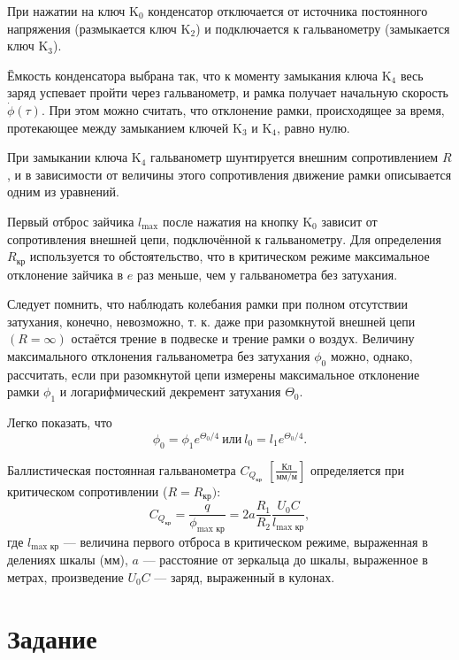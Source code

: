 При нажатии на ключ $\text{K}_0$ конденсатор отключается от источника постоянного напряжения (размыкается ключ $\text{K}_2$) и подключается к гальванометру (замыкается ключ $\text{K}_3$).

Ёмкость конденсатора выбрана так, что к моменту замыкания ключа $\text{K}_4$ весь заряд успевает пройти через гальванометр, и рамка получает начальную скорость $\dot{\phi}(\tau)$. При этом можно считать, что отклонение рамки, происходящее за время, протекающее между замыканием ключей $\text{K}_3$ и $\text{K}_4$, равно нулю.

При замыкании ключа $\text{K}_4$ гальванометр шунтируется внешним сопротивлением $R$, и в зависимости от величины этого сопротивления движение рамки описывается одним из уравнений.

Первый отброс зайчика $l_{\text{max}}$ после нажатия на кнопку $\text{K}_0$ зависит от сопротивления внешней цепи, подключённой к гальванометру. Для определения $R_{\text{кр}}$ используется то обстоятельство, что в критическом режиме максимальное отклонение зайчика в $e$ раз меньше, чем у гальванометра без затухания.

Следует помнить, что наблюдать колебания рамки при полном отсутствии затухания, конечно, невозможно, т. к. даже при разомкнутой внешней цепи $(R = \infty)$ остаётся трение в подвеске и трение рамки о воздух. Величину максимального отклонения гальванометра без затухания $\phi_0$ можно, однако, рассчитать, если при разомкнутой цепи измерены максимальное отклонение рамки $\phi_1$ и логарифмический декремент затухания $\Theta_0$.

Легко показать, что
\begin{equation}
    \phi_0 = \phi_1 e^{{\Theta_0}/4}~\text{или}~l_0 = l_1 e^{{\Theta_0}/4}.
\end{equation}

Баллистическая постоянная гальванометра $C_{Q_{\text{кр}}}$ $\left[\frac{\text{Кл}}{\text{мм/м}}\right]$ определяется при критическом сопротивлении ($R = R_{\text{кр}})$:
\begin{equation}
    C_{Q_{\text{кр}}} = \frac{q}{\phi_{\text{max~кр}}} = 2a\frac{R_1}{R_2}\frac{U_0 C}{l_{\text{max~кр}}},
\end{equation}
где $l_{\text{max~кр}}$ — величина первого отброса в критическом режиме, выраженная в делениях шкалы (мм), $a$ — расстояние от зеркальца до шкалы, выраженное в метрах, произведение $U_0 C$ — заряд, выраженный в кулонах. 

\section{\label{sec:level1}Задание}

